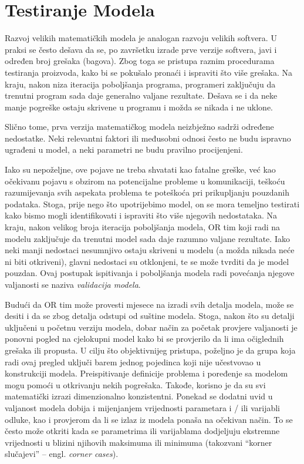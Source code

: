 \documentclass[a4paper, utf8, 11pt, colorlinks]{book}
\begin{document}


\section{Testiranje Modela}
Razvoj velikih matematičkih modela je analogan razvoju velikih softvera. U praksi se često dešava da se, po završetku izrade prve verzije softvera, javi i određen broj grešaka (bagova). Zbog toga se pristupa raznim procedurama testiranja proizvoda, kako bi se pokušalo pronaći i
ispraviti što više grešaka. Na kraju, nakon niza iteracija poboljšanja programa, programeri zaključuju da trenutni program sada
daje generalno valjane rezultate. Dešava se i da neke manje pogreške ostaju skrivene u programu i možda se nikada i ne uklone.

Slično tome, prva verzija matematičkog modela neizbježno sadrži određene
nedostatke. Neki relevantni faktori ili međusobni odnosi često ne budu  ispravno ugrađeni
u model, a neki parametri ne budu pravilno procijenjeni. 

Iako su nepoželjne, ove pojave ne treba shvatati kao fatalne greške, već kao očekivanu pojavu s obzirom na potencijalne probleme u komunikaciji, teškoću razumijevanja svih aspekata problema te poteškoća pri prikupljanju pouzdanih podataka. Stoga, prije nego što upotrijebimo model, on se mora  temeljno testirati kako bismo mogli  identifikovati 
i ispraviti što više njegovih nedostataka. Na kraju, nakon velikog broja iteracija poboljšanja 
modela, OR tim koji radi na modelu zaključuje da trenutni model sada daje razumno valjane rezultate.  Iako neki manji nedostaci nesumnjivo ostaju skriveni u modelu (a možda nikada neće ni biti otkriveni), glavni nedostaci su otklonjeni, te se može tvrditi da je model pouzdan. Ovaj postupak ispitivanja i poboljšanja modela radi povećanja njegove valjanosti se naziva \emph{validacija modela}. 

Budući da OR tim može provesti mjesece na izradi svih detalja modela, može se desiti i da se zbog detalja odstupi od suštine modela. Stoga, nakon što su detalji uključeni u 
početnu verziju modela, dobar način za početak provjere valjanosti je ponovni pogled na cjelokupni model kako bi se provjerilo da li ima  očiglednih grešaka ili propusta. U cilju što objektivnijeg pristupa, poželjno je da grupa koja radi ovaj pregled uključi barem jednog pojedinca koji nije učestvovao u konstrukciji modela. Preispitivanje definicije
problema i poređenje sa modelom mogu pomoći u otkrivanju nekih pogrešaka. Takođe, korisno je da su svi matematički izrazi dimenzionalno konzistentni.  Ponekad se  dodatni uvid u valjanost modela dobija i 
mijenjanjem vrijednosti parametara i / ili varijabli odluke, kao i provjerom da li se  izlaz iz modela ponaša na očekivan način. To se često može otkriti kada se parametrima ili varijablama dodjeljuju ekstremne vrijednosti u blizini njihovih maksimuma ili minimuma (takozvani ``korner slučajevi'' -- engl. \textit{corner cases}). 
\end{document}
